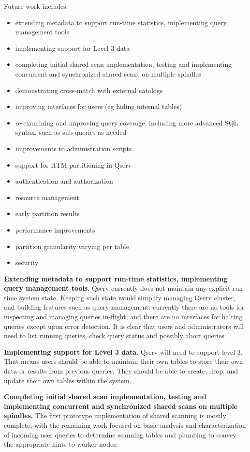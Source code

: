 \documentclass[DM,lsstdraft,toc]{lsstdoc}
\begin{document}
Future work includes:

\begin{itemize}
\item
  extending metadata to support run-time statistics, implementing query
  management tools
\item
  implementing support for Level 3 data
\item
  completing initial shared scan implementation, testing and
  implementing concurrent and synchronized shared scans on multiple
  spindles
\item
  demonstrating cross-match with external catalogs
\item
  improving interfaces for users (eg hiding internal tables)
\item
  re-examining and improving query coverage, including more advanced SQL
  syntax, such as sub-queries as needed
\item
  improvements to administration scripts
\item
  support for HTM partitioning in Qserv
\item
  authentication and authorization
\item
  resource management
\item
  early partition results
\item
  performance improvements
\item
  partition granularity varying per table
\item
  security
\end{itemize}

\textbf{Extending metadata to support run-time statistics, implementing
query management tools}. Qserv currently does not maintain any explicit
run-time system state. Keeping such state would simplify managing Qserv
cluster, and building features such as query management: currently there
are no tools for inspecting and managing queries in-flight, and there
are no interfaces for halting queries except upon error detection. It is
clear that users and administrators will need to list running queries,
check query status and possibly abort queries.

\textbf{Implementing support for Level 3 data}. Qserv will need to
support level 3. That means users should be able to maintain their own
tables to store their own data or results from previous queries. They
should be able to create, drop, and update their own tables within the
system.

\textbf{Completing initial shared scan implementation, testing and
implementing concurrent and synchronized shared scans on multiple
spindles.} The first prototype implementation of shared scanning is
mostly complete, with the remaining work focused on basic analysis and
characterization of incoming user queries to determine scanning tables
and plumbing to convey the appropriate hints to worker nodes.
\end{document}
